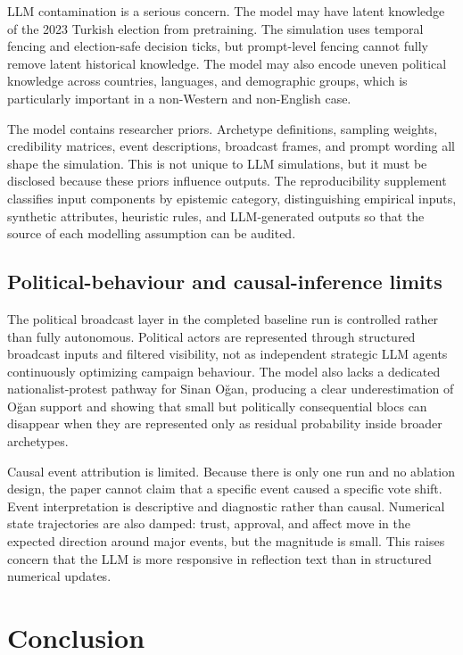 \documentclass[pdflatex,sn-mathphys-num,iicol]{sn-jnl}
\begin{document}
LLM contamination is a serious concern. The model may have latent knowledge of
the 2023 Turkish election from pretraining. The simulation uses temporal fencing
and election-safe decision ticks, but prompt-level fencing cannot fully remove
latent historical knowledge. The model may also encode uneven political knowledge
across countries, languages, and demographic groups, which is particularly
important in a non-Western and non-English case.

The model contains researcher priors. Archetype definitions, sampling weights,
credibility matrices, event descriptions, broadcast frames, and prompt wording
all shape the simulation. This is not unique to LLM simulations, but it must be
disclosed because these priors influence outputs. The reproducibility supplement
classifies input components by epistemic category, distinguishing empirical
inputs, synthetic attributes, heuristic rules, and LLM-generated outputs so
that the source of each modelling assumption can be audited.

\subsection{Political-behaviour and causal-inference
limits}\label{subsec:political}

The political broadcast layer in the completed baseline run is controlled rather
than fully autonomous. Political actors are represented through structured
broadcast inputs and filtered visibility, not as independent strategic LLM
agents continuously optimizing campaign behaviour. The model also lacks a
dedicated nationalist-protest pathway for Sinan Oğan, producing a clear
underestimation of Oğan support and showing that small but politically
consequential blocs can disappear when they are represented only as residual
probability inside broader archetypes.

Causal event attribution is limited. Because there is only one run and no
ablation design, the paper cannot claim that a specific event caused a specific
vote shift. Event interpretation is descriptive and diagnostic rather than
causal. Numerical state trajectories are also damped: trust, approval, and
affect move in the expected direction around major events, but the magnitude is
small. This raises concern that the LLM is more responsive in reflection text
than in structured numerical updates.


\section{Conclusion}\label{sec:conclusion}
\end{document}
